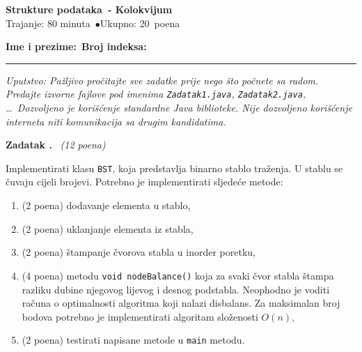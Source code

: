\documentclass[11pt,a4paper]{article}
\newcommand{\predmet}{Strukture podataka}
\newcommand{\tipIspita}{Kolokvijum}
\newcommand{\trajanje}{80 minuta}
\newcommand{\ukupnoPoena}{20}
\newcounter{zadatak}
\newenvironment{zadatak}[1][]{%
    \par\vspace{0.9em}%
    \refstepcounter{zadatak}%
    \noindent\textbf{Zadatak \thezadatak.}%
    \def\tempPoena{#1}%
    \ifx\tempPoena\empty\else\ \textit{(#1 poena)}\fi%
    \par\medskip\noindent\ignorespaces%
}{\par}
\begin{document}
\thispagestyle{prva}

\begin{center}
    {\Large\bfseries \predmet\  - \tipIspita}\\[0.2em]
    {\small Trajanje: \trajanje\ \quad$\bullet$\quad Ukupno: \ukupnoPoena\ poena}
\end{center}

\vspace{0.3em}
\noindent\textbf{Ime i prezime:}~\dotfill \qquad \textbf{Broj indeksa:}~\dotfill

\vspace{0.3em}
\hrule
\vspace{0.4em}

\noindent\textit{Uputstvo: Pažljivo pročitajte sve zadatke prije nego što počnete sa radom. Predajte izvorne fajlove pod imenima \texttt{Zadatak1.java}, \texttt{Zadatak2.java}, \ldots\ Dozvoljeno je korišćenje standardne Java biblioteke. Nije dozvoljeno korišćenje interneta niti komunikacija sa drugim kandidatima.}

\vspace{0.6em}


\begin{zadatak}[12]
Implementirati klasu \texttt{BST}, koja predstavlja binarno stablo traženja. U stablu se čuvaju cijeli brojevi. Potrebno je implementirati sljedeće metode:
\begin{enumerate}[label=(\alph*),leftmargin=2em,itemsep=0pt]
    \item (2 poena) dodavanje elementa u stablo,
    \item (2 poena) uklanjanje elementa iz stabla,
    \item (2 poena) štampanje čvorova stabla u inorder poretku,
    \item (4 poena) metodu \texttt{void nodeBalance()} koja za svaki čvor stabla štampa razliku dubine njegovog lijevog i desnog podstabla. Neophodno je voditi računa o optimalnosti algoritma koji nalazi disbalans. Za maksimalan broj bodova potrebno je implementirati algoritam složenosti $O(n)$,
    \item (2 poena) testirati napisane metode u \texttt{main} metodu.
\end{enumerate}
\end{zadatak}
\end{document}
